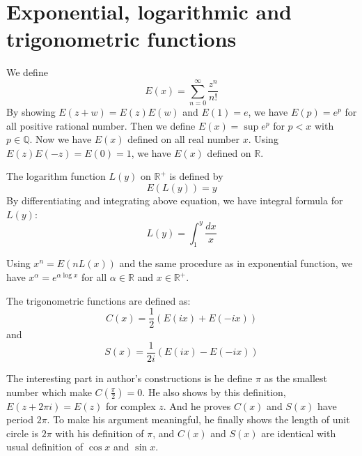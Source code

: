 \section{Exponential, logarithmic and trigonometric functions}
We define
\begin{equation*}
    E(x)=\sum_{n=0}^\infty \frac{z^n}{n!}
\end{equation*}
By showing $E(z+w)=E(z)E(w)$ and $E(1)=e$, we have $E(p)=e^p$ for all positive rational number. Then we define $E(x)=\sup e^p$ for $p<x$ with $p\in \mathbb{Q}$. Now we have $E(x)$ defined on all real number $x$. Using $E(z)E(-z)=E(0)=1$, we have $E(x)$ defined on $\mathbb{R}$.\par
The logarithm function $L(y)$ on $\mathbb{R}^+$ is defined by 
\begin{equation*}
    E(L(y))=y
\end{equation*}
By differentiating and integrating above equation, we have integral formula for $L(y)$:
\begin{equation*}
    L(y)=\int_{1}^{y}\frac{dx}{x}
\end{equation*}\par
Using $x^n=E(nL(x))$ and the same procedure as in exponential function, we have $x^\alpha=e^{\alpha \log x}$ for all $\alpha\in \mathbb{R}$ and $x\in \mathbb{R}^+$.\par
The trigonometric functions are defined as:
\begin{equation*}
    C(x)=\frac{1}{2}(E(ix)+E(-ix))
\end{equation*}
and 
\begin{equation*}
    S(x)=\frac{1}{2i}(E(ix)-E(-ix))
\end{equation*}\par
The interesting part in author's constructions is he define $\pi$ as the smallest number which make $C(\frac{\pi}{2})=0$. He also shows by this definition, $E(z+2\pi i)=E(z)$ for complex $z$. And he proves $C(x)$ and $S(x)$ have period $2\pi$. To make his argument meaningful, he finally shows the length of unit circle is $2\pi$ with his definition of $\pi$, and $C(x)$ and $S(x)$ are identical with usual definition of $\cos x$ and $\sin x$.

